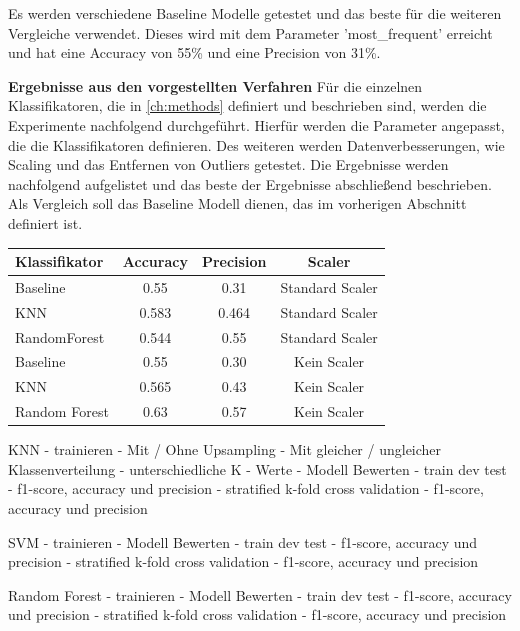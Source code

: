 Es werden verschiedene Baseline Modelle getestet und das beste für die weiteren Vergleiche verwendet. 
Dieses wird mit dem Parameter 'most\_frequent' erreicht und hat eine Accuracy von 55\% und eine Precision von 31\%. 

\textbf{Ergebnisse aus den vorgestellten Verfahren}
Für die einzelnen Klassifikatoren, die in \autoref{ch:methods} definiert und beschrieben sind, werden die Experimente nachfolgend durchgeführt.
Hierfür werden die Parameter angepasst, die die Klassifikatoren definieren. %
Des weiteren werden Datenverbesserungen, wie Scaling und das Entfernen von Outliers getestet. 
Die Ergebnisse werden nachfolgend aufgelistet und das beste der Ergebnisse abschließend beschrieben. 
Als Vergleich soll das Baseline Modell dienen, das im vorherigen Abschnitt definiert ist.



\begin{tabular}[h]{l|c|c|c}
Klassifikator & Accuracy        & Precision & Scaler \\ \hline
Baseline & 0.55 & 0.31 & Standard Scaler \\
KNN & 0.583 & 0.464 & Standard Scaler \\
RandomForest & 0.544 & 0.55 & Standard Scaler \\


Baseline & 0.55 & 0.30 & Kein Scaler \\
KNN & 0.565 & 0.43 & Kein Scaler \\
Random Forest & 0.63 & 0.57 & Kein Scaler \\

\end{tabular}




KNN
- trainieren
    - Mit / Ohne Upsampling
    - Mit gleicher / ungleicher Klassenverteilung
    - unterschiedliche K - Werte
- Modell Bewerten 
    - train dev test
    - f1-score, accuracy und precision
    - stratified k-fold cross validation
    - f1-score, accuracy und precision 

    
SVM
- trainieren
- Modell Bewerten 
    - train dev test
    - f1-score, accuracy und precision
    - stratified k-fold cross validation
    - f1-score, accuracy und precision 

Random Forest
- trainieren
- Modell Bewerten 
    - train dev test
    - f1-score, accuracy und precision
    - stratified k-fold cross validation
    - f1-score, accuracy und precision 


